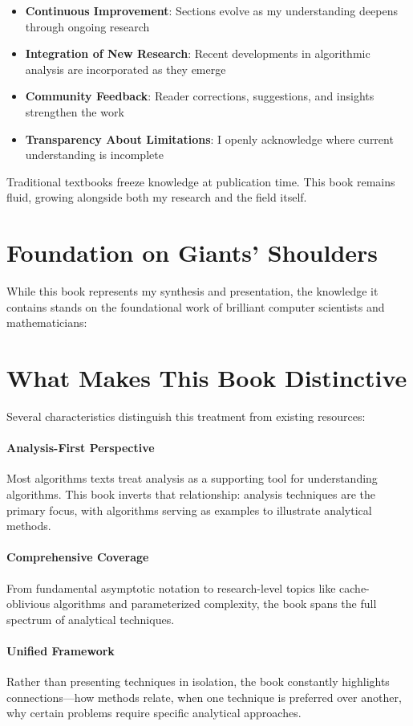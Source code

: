 \begin{itemize}
	\item \textbf{Continuous Improvement}: Sections evolve as my understanding deepens through ongoing research
	\item \textbf{Integration of New Research}: Recent developments in algorithmic analysis are incorporated as they emerge
	\item \textbf{Community Feedback}: Reader corrections, suggestions, and insights strengthen the work
	\item \textbf{Transparency About Limitations}: I openly acknowledge where current understanding is incomplete
\end{itemize}
Traditional textbooks freeze knowledge at publication time. This book remains fluid, growing alongside both my research and the field itself.

\section*{Foundation on Giants' Shoulders}

While this book represents my synthesis and presentation, the knowledge it contains stands on the foundational work of brilliant computer scientists and mathematicians:
\section*{What Makes This Book Distinctive}

Several characteristics distinguish this treatment from existing resources:

\paragraph{Analysis-First Perspective}
Most algorithms texts treat analysis as a supporting tool for understanding algorithms. This book inverts that relationship: analysis techniques are the primary focus, with algorithms serving as examples to illustrate analytical methods.

\paragraph{Comprehensive Coverage}
From fundamental asymptotic notation to research-level topics like cache-oblivious algorithms and parameterized complexity, the book spans the full spectrum of analytical techniques.

\paragraph{Unified Framework}
Rather than presenting techniques in isolation, the book constantly highlights connections—how methods relate, when one technique is preferred over another, why certain problems require specific analytical approaches.

